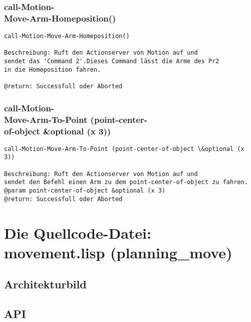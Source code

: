 \documentclass{suturo}
\begin{document}
\subsubsection{call-Motion-\\
Move-Arm-Homeposition()}
\begin{verbatim}
call-Motion-Move-Arm-Homeposition()

Beschreibung: Ruft den Actionserver von Motion auf und
sendet das 'Command 2'.Dieses Command lässt die Arme des Pr2 
in die Homeposition fahren.

@return: Successfull oder Aborted
\end{verbatim}



\subsubsection{call-Motion-\\
Move-Arm-To-Point (point-center-\\of-object \&optional (x 3))
}
\begin{verbatim}
call-Motion-Move-Arm-To-Point (point-center-of-object \&optional (x 3))

Beschreibung: Ruft den Actionserver von Motion auf und 
sendet den Befehl einen Arm zu dem point-center-of-object zu fahren.
@param point-center-of-object &optional (x 3)
@return: Successfull oder Aborted
\end{verbatim}

\newpage
\section{Die Quellcode-Datei: movement.lisp (planning\_move)}
\subsection{Architekturbild}


\begin{figure}[!htb]
\end{figure}


\subsection{API}
\end{document}
